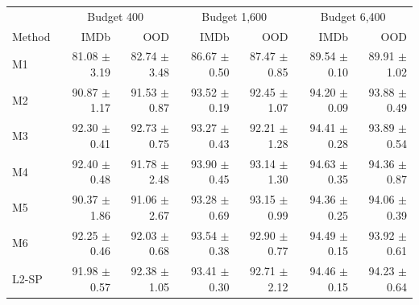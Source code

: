 \begin{tabular}{lrrrrrr}\toprule
& \multicolumn{2}{c}{Budget 400} & \multicolumn{2}{c}{Budget 1,600} & \multicolumn{2}{c}{Budget 6,400}\\ Method & IMDb & OOD & IMDb & OOD & IMDb & OOD\\\midrule
M1 & 81.08 $\pm$ 3.19 & 82.74 $\pm$ 3.48 & 86.67 $\pm$ 0.50 & 87.47 $\pm$ 0.85 & 89.54 $\pm$ 0.10 & 89.91 $\pm$ 1.02\\
M2 & 90.87 $\pm$ 1.17 & 91.53 $\pm$ 0.87 & 93.52 $\pm$ 0.19 & 92.45 $\pm$ 1.07 & 94.20 $\pm$ 0.09 & 93.88 $\pm$ 0.49\\
M3 & 92.30 $\pm$ 0.41 & 92.73 $\pm$ 0.75 & 93.27 $\pm$ 0.43 & 92.21 $\pm$ 1.28 & 94.41 $\pm$ 0.28 & 93.89 $\pm$ 0.54\\
M4 & 92.40 $\pm$ 0.48 & 91.78 $\pm$ 2.48 & 93.90 $\pm$ 0.45 & 93.14 $\pm$ 1.30 & 94.63 $\pm$ 0.35 & 94.36 $\pm$ 0.87\\
M5 & 90.37 $\pm$ 1.86 & 91.06 $\pm$ 2.67 & 93.28 $\pm$ 0.69 & 93.15 $\pm$ 0.99 & 94.36 $\pm$ 0.25 & 94.06 $\pm$ 0.39\\
M6 & 92.25 $\pm$ 0.46 & 92.03 $\pm$ 0.68 & 93.54 $\pm$ 0.38 & 92.90 $\pm$ 0.77 & 94.49 $\pm$ 0.15 & 93.92 $\pm$ 0.61\\
L2-SP & 91.98 $\pm$ 0.57 & 92.38 $\pm$ 1.05 & 93.41 $\pm$ 0.30 & 92.71 $\pm$ 2.12 & 94.46 $\pm$ 0.15 & 94.23 $\pm$ 0.64\\
\bottomrule\end{tabular}
